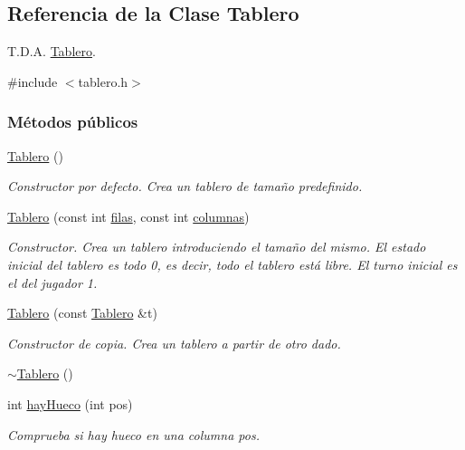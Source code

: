 \hypertarget{classTablero}{}\subsection{Referencia de la Clase Tablero}
\label{classTablero}


T.\+D.\+A. \hyperlink{classTablero}{Tablero}.  




{\ttfamily \#include $<$tablero.\+h$>$}

\subsubsection*{Métodos públicos}
\begin{DoxyCompactItemize}
\item 
\hyperlink{classTablero_ab4912f28f1db392e1dd44ddc98bd4f59}{Tablero} ()
\begin{DoxyCompactList}\small\item\em Constructor por defecto. Crea un tablero de tamaño predefinido. \end{DoxyCompactList}\item 
\hyperlink{classTablero_a51ae562c7dee2909d0fa335b8c3eaf71}{Tablero} (const int \hyperlink{classTablero_a6b1f04a8502106c33bf5469f791320e6}{filas}, const int \hyperlink{classTablero_ac70289ec91b44d05da648770cc46801d}{columnas})
\begin{DoxyCompactList}\small\item\em Constructor. Crea un tablero introduciendo el tamaño del mismo. El estado inicial del tablero es todo 0, es decir, todo el tablero está libre. El turno inicial es el del jugador 1. \end{DoxyCompactList}\item 
\hyperlink{classTablero_a95ccd1353038a966ad3304ead106c0d4}{Tablero} (const \hyperlink{classTablero}{Tablero} \&t)
\begin{DoxyCompactList}\small\item\em Constructor de copia. Crea un tablero a partir de otro dado. \end{DoxyCompactList}\item 
\hyperlink{classTablero_a7d4a64967ce0bbe2cce49ec846834c84}{$\sim$\+Tablero} ()
\item 
int \hyperlink{classTablero_ada687d3c234c4fb416ca76461adf6ba4}{hay\+Hueco} (int pos)
\begin{DoxyCompactList}\small\item\em Comprueba si hay hueco en una columna \textquotesingle{}pos\textquotesingle{}. \end{DoxyCompactList}\item 

\end{DoxyCompactItemize}
